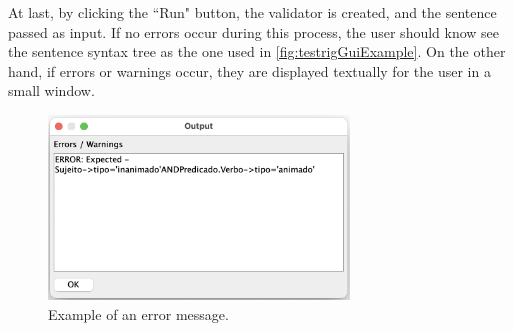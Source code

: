 \newpage
At last, by clicking the ``Run" button, the validator is created, and the sentence passed as input.
If no errors occur during this process, the user should know see the sentence syntax tree as the one used in \autoref{fig:testrigGuiExample}.
On the other hand, if errors or warnings occur, they are displayed textually for the user in a small window.

\begin{figure}[h]
    \centering
    \includegraphics[width=8cm]{images/lyntax_error_window.png}
    \caption{Example of an error message.}
    \label{fig:lyntaxErrorWindow}
\end{figure}

